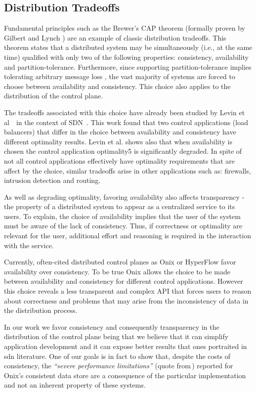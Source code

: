 \subsection{Distribution Tradeoffs}
Fundamental principles such as the  Brewer's CAP theorem \cite{Brewer:fk} (formally proven by Gilbert and Lynch \cite{Gilbert:2002il}) are an example of classic distribution tradeoffs. This theorem states that a distributed system may be simultaneously (i.e., at the same time) qualified with only two of the following properties: consistency, availability and partition-tolerance. Furthermore, since supporting partition-tolerance implies tolerating arbitrary message loss  \cite{Gilbert:2002il},  the vast majority of systems are forced to choose between availability and consistency. This choice also applies to the distribution of the control plane. 


The tradeoffs associated with this choice have already been studied by Levin et al~\etal\ in the context of SDN~\cite{levin}. This work found that two control applications (load balancers) that differ in the choice between availability and consistency have different optimality results. Levin et al. shows also that when availability is chosen the control application optimality5 is significantly degraded. In spite of not all control applications effectively have optimality requirements that are affect by the choice, similar tradeoffs arise in other applications such as: firewalls, intrusion detection and routing.

As well as degrading optimality, favoring availability also affects transparency - the property of a distributed system to appear as a centralized service to its users. To explain, the choice of availability implies that the user of the system must be aware of the lack of consistency. Thus, if correctness or optimality are relevant for the user, additional effort and reasoning is required in the interaction with the service. 

Currently, often-cited distributed control planes as Onix \cite{Koponen:2010th} or HyperFlow  \cite{Tootoonchian:2010vy} favor availability over consistency. To be true Onix allows the choice to be made between availability and consistency for different control applications. However this choice reveals a less transparent and complex API that forces users to reason about correctness and problems that may arise from the inconsistency of data in the distribution process. 

In our work we favor consistency and consequently transparency in the distribution of the control plane being that we believe that it can simplify application development and it can expose better results that ones portraited in \gls{sdn} literature.
One of our goals is in fact to show that, despite the costs of consistency, the \emph{``severe performance limitations''} (quote from\,\cite{koponen2010}) reported for Onix's consistent  data store are a consequence of the particular implementation and not an inherent property of these systems. 



